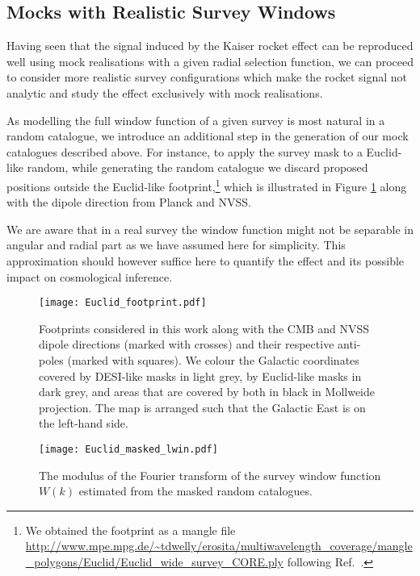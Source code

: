 \documentclass[a4paper,11pt]{article}
\begin{document}
\subsection{Mocks with Realistic Survey Windows}
\label{sec:survey_mocks}

Having seen that the signal induced by the Kaiser rocket effect can be reproduced well using mock realisations with a given radial selection function,  we can proceed to consider more realistic survey configurations which make the rocket signal not analytic and study the effect exclusively  with mock realisations.

 As modelling the full window function of a given survey is most natural in a random catalogue, we introduce an additional step in the generation of our mock catalogues described above. For instance, to apply the survey mask to a Euclid-like random, while generating the random catalogue we discard proposed  positions outside the Euclid-like footprint,\footnote{We obtained  the footprint as a mangle file 
\url{http://www.mpe.mpg.de/~tdwelly/erosita/multiwavelength_coverage/mangle_polygons/Euclid/Euclid_wide_survey_CORE.ply}  following Ref.~\cite
{Swanson:2007aj}.} which is illustrated in Figure  \ref{fig:survey_footprints} along with the dipole direction from Planck and NVSS.

We are aware that in a real survey the window function might not be separable in angular and radial part as we have assumed here for simplicity. This approximation should however suffice here to quantify the effect and its possible impact on cosmological inference. 
\begin{figure}
    \texttt{[image: Euclid\_footprint.pdf]}
    \caption{Footprints considered in this work along with the CMB and NVSS dipole directions (marked with crosses) and their respective anti-poles (marked with squares). We colour the Galactic coordinates covered by DESI-like masks in light grey, by Euclid-like masks in dark grey, and areas that are covered by both in black in Mollweide projection. The map is arranged such that the Galactic East is on the left-hand side.}\label{fig:survey_footprints}
\end{figure}
\begin{figure}
    \texttt{[image: Euclid\_masked\_lwin.pdf]}
    \caption{The modulus of the Fourier transform of the survey window function $W(k)$ estimated from the masked random catalogues.} 
    \label{fig:Euclid_masked_lwin}
\end{figure}
\end{document}
